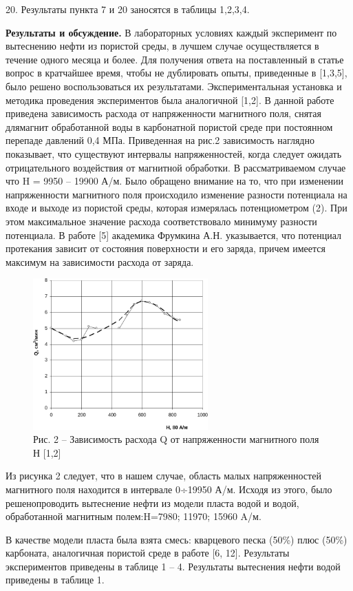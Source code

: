 \begin{multicols}{2}
20. Результаты пункта 7 и 20 заносятся в таблицы 1,2,3,4.

{\bfseries Результаты и обсуждение.} В лабораторных условиях каждый
эксперимент по вытеснению нефти из пористой среды, в лучшем случае
осуществляется в течение одного месяца и более. Для получения ответа на
поставленный в статье вопрос в кратчайшее время, чтобы не дублировать
опыты, приведенные в {[}1,3,5{]}, было решено воспользоваться их
результатами. Экспериментальная установка и методика проведения
экспериментов была аналогичной {[}1,2{]}. В данной работе приведена
зависимость расхода от напряженности магнитного поля, снятая длямагнит
обработанной воды в карбонатной пористой среде при постоянном перепаде
давлений 0,4 МПа. Приведенная на рис.2 зависимость наглядно показывает,
что существуют интервалы напряженностей, когда следует ожидать
отрицательного воздействия от магнитной обработки. В рассматриваемом
случае что H = 9950 -- 19900 А/м. Было обращено внимание на то, что при
изменении напряженности магнитного поля происходило изменение разности
потенциала на входе и выходе из пористой среды, которая измерялась
потенциометром (2). При этом максимальное значение расхода
соответствовало минимуму разности потенциала. В работе {[}5{]} академика
Фрумкина А.Н. указывается, что потенциал протекания зависит от состояния
поверхности и его заряда, причем имеется максимум на зависимости расхода
от заряда.
\end{multicols}

\begin{figure}[H]
	\centering
	\includegraphics[width=0.6\textwidth]{media/gorn4/image3}
	\caption*{Рис. 2 -- Зависимость расхода Q от напряженности магнитного поля Н {[}1,2{]}}
\end{figure}

\begin{multicols}{2}
Из рисунка 2 следует, что в нашем случае, область малых напряженностей
магнитного поля находится в интервале 0÷19950 А/м. Исходя из этого, было
решенопроводить вытеснение нефти из модели пласта водой и водой,
обработанной магнитным полем:H=7980; 11970; 15960 A/м.

В качестве модели пласта была взята смесь: кварцевого песка (50\%) плюс
(50\%) карбоната, аналогичная пористой среде в работе {[}6, 12{]}.
Результаты экспериментов приведены в таблице 1 -- 4. Результаты
вытеснения нефти водой приведены в таблице 1.
\end{multicols}

